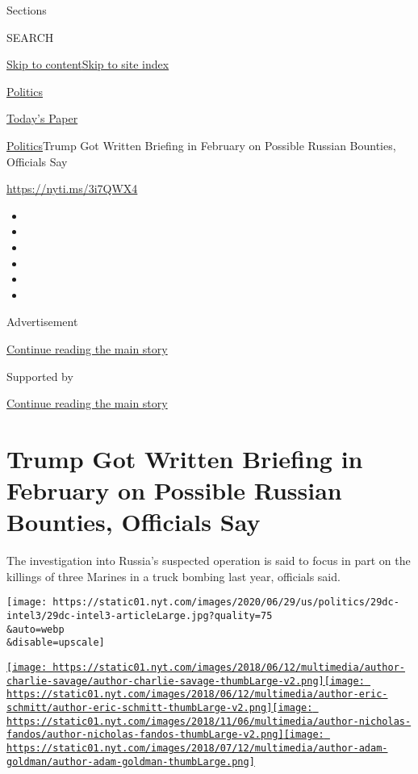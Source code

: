 Sections

SEARCH

\protect\hyperlink{site-content}{Skip to
content}\protect\hyperlink{site-index}{Skip to site index}

\href{https://www.nytimes.com/section/politics}{Politics}

\href{https://myaccount.nytimes.com/auth/login?response_type=cookie\&client_id=vi}{}

\href{https://www.nytimes.com/section/todayspaper}{Today's Paper}

\href{/section/politics}{Politics}\textbar{}Trump Got Written Briefing
in February on Possible Russian Bounties, Officials Say

\url{https://nyti.ms/3i7QWX4}

\begin{itemize}
\item
\item
\item
\item
\item
\item
\end{itemize}

Advertisement

\protect\hyperlink{after-top}{Continue reading the main story}

Supported by

\protect\hyperlink{after-sponsor}{Continue reading the main story}

\hypertarget{trump-got-written-briefing-in-february-on-possible-russian-bounties-officials-say}{%
\section{Trump Got Written Briefing in February on Possible Russian
Bounties, Officials
Say}\label{trump-got-written-briefing-in-february-on-possible-russian-bounties-officials-say}}

The investigation into Russia's suspected operation is said to focus in
part on the killings of three Marines in a truck bombing last year,
officials said.

\texttt{[image: https://static01.nyt.com/images/2020/06/29/us/politics/29dc-intel3/29dc-intel3-articleLarge.jpg?quality=75\\\&auto=webp\\\&disable=upscale]}

\href{https://www.nytimes.com/by/charlie-savage}{\texttt{[image: https://static01.nyt.com/images/2018/06/12/multimedia/author-charlie-savage/author-charlie-savage-thumbLarge-v2.png]}}\href{https://www.nytimes.com/by/eric-schmitt}{\texttt{[image: https://static01.nyt.com/images/2018/06/12/multimedia/author-eric-schmitt/author-eric-schmitt-thumbLarge-v2.png]}}\href{https://www.nytimes.com/by/nicholas-fandos}{\texttt{[image: https://static01.nyt.com/images/2018/11/06/multimedia/author-nicholas-fandos/author-nicholas-fandos-thumbLarge-v2.png]}}\href{https://www.nytimes.com/by/adam-goldman}{\texttt{[image: https://static01.nyt.com/images/2018/07/12/multimedia/author-adam-goldman/author-adam-goldman-thumbLarge.png]}}

